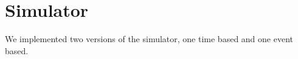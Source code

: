 \newpage\cleardoublepage{}
\section{Simulator}
\label{sec:sim}

We implemented two versions of the simulator, one time based and one event based.